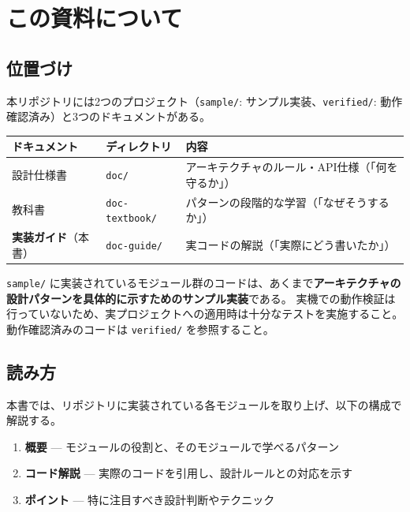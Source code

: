 \section{この資料について}

\subsection{位置づけ}

本リポジトリには2つのプロジェクト（\texttt{sample/}: サンプル実装、\texttt{verified/}: 動作確認済み）と3つのドキュメントがある。

\begin{tabularx}{\textwidth}{l l X}
\toprule
\textbf{ドキュメント} & \textbf{ディレクトリ} & \textbf{内容} \\
\midrule
設計仕様書 & \texttt{doc/} & アーキテクチャのルール・API仕様（「何を守るか」） \\
教科書 & \texttt{doc-textbook/} & パターンの段階的な学習（「なぜそうするか」） \\
\textbf{実装ガイド}（本書） & \texttt{doc-guide/} & 実コードの解説（「実際にどう書いたか」） \\
\bottomrule
\end{tabularx}

\begin{cautionbox}[サンプルコードについて]
\texttt{sample/} に実装されているモジュール群のコードは、あくまで\textbf{アーキテクチャの設計パターンを具体的に示すためのサンプル実装}である。
実機での動作検証は行っていないため、実プロジェクトへの適用時は十分なテストを実施すること。
動作確認済みのコードは \texttt{verified/} を参照すること。
\end{cautionbox}

\subsection{読み方}

本書では、リポジトリに実装されている各モジュールを取り上げ、以下の構成で解説する。

\begin{enumerate}
    \item \textbf{概要} — モジュールの役割と、そのモジュールで学べるパターン
    \item \textbf{コード解説} — 実際のコードを引用し、設計ルールとの対応を示す
    \item \textbf{ポイント} — 特に注目すべき設計判断やテクニック
\end{enumerate}

